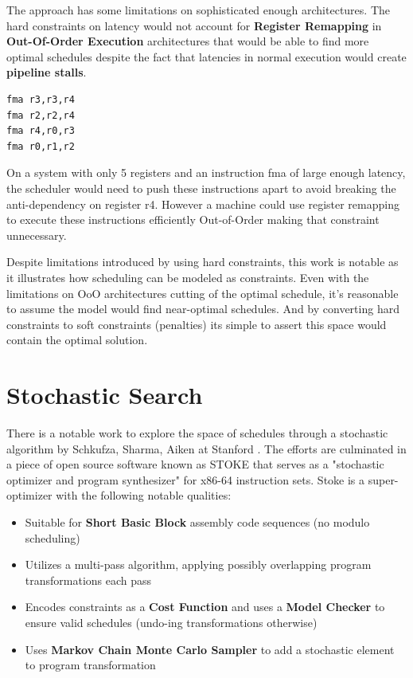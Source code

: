 \documentclass[12pt]{report}
\def\mytitle{??? Program Code ???}
\begin{document}
The approach has some limitations on sophisticated enough architectures. The
hard constraints on latency would not account for \textbf{Register Remapping} in
\textbf{Out-Of-Order Execution} architectures that would be able to find more
optimal schedules despite the fact that latencies in normal execution would
create \textbf{pipeline stalls}.

\def\mytitle{{\sc Assembly Code Example Requiring Register Renaming for Optimal Scheduling \hspace{12em} \color{grey}{.} }}
\begin{verbatim}
fma r3,r3,r4
fma r2,r2,r4
fma r4,r0,r3
fma r0,r1,r2
\end{verbatim}
On a system with only 5 registers and an instruction fma of large enough
latency, the scheduler would need to push these instructions apart to avoid
breaking the anti-dependency on register r4. However a machine
could use register remapping to execute these instructions efficiently Out-of-Order
making that constraint unnecessary. 

Despite limitations introduced by using hard constraints, this work is
notable as it illustrates how scheduling can be modeled as constraints. Even
with the limitations on OoO architectures cutting of the optimal schedule,
it's reasonable to assume the model would find near-optimal schedules. And by
converting hard constraints to soft constraints (penalties) its simple to
assert this space would contain the optimal solution.

\section{Stochastic Search}
\label{sec:orgc125d70}
There is a notable work to explore the space of schedules through a
stochastic algorithm by Schkufza, Sharma, Aiken at Stanford
\parencite{Schkufza:2016:SPO:2886013.2863701}. The efforts are culminated in
a piece of open source software known as STOKE that serves as a "stochastic
optimizer and program synthesizer" for x86-64 instruction sets. Stoke is a
super-optimizer with the following notable qualities:

\begin{itemize}
\item Suitable for \textbf{Short Basic Block} assembly code sequences (no modulo scheduling)
\item Utilizes a multi-pass algorithm, applying possibly overlapping program
transformations each pass
\item Encodes constraints as a \textbf{Cost Function} and uses a \textbf{Model Checker} to
ensure valid schedules (undo-ing transformations otherwise)
\item Uses \textbf{Markov Chain Monte Carlo Sampler} to add a stochastic element to
program transformation
\end{itemize}
\end{document}
